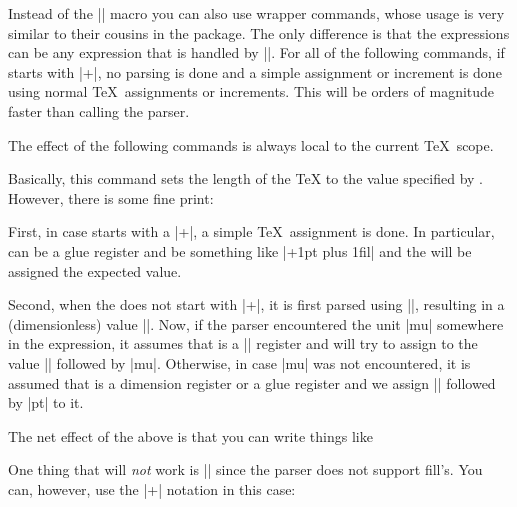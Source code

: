 Instead of the |\pgfmathparse| macro you can also use wrapper commands,
whose usage is very similar to their cousins in the \calcname{}
package. The only difference is that the expressions can be any
expression that is handled by |\pgfmathparse|.
For all of the following commands, if  starts with
|+|, no parsing is done and a simple assignment or increment is done
using normal \TeX\ assignments or increments. This will be orders of
magnitude faster than calling the parser.

The effect of the following commands is always local to the current
\TeX\ scope.

\begin{command}{\pgfmathsetlength{}}
  Basically, this command sets the length of the \TeX{}
   to the value specified by
  . However, there is some fine print:

  First, in case  starts with a |+|, a simple \TeX\
  assignment is done. In particular,  can be a glue
  register and \meta{expression} be something like |+1pt plus 1fil|
  and the \meta{register} will be assigned the expected value.

  Second, when the  does not start with |+|, it is
  first parsed using |\pgfmathparse|, resulting in a (dimensionless)
  value |\pgfmathresult|. Now, if the parser encountered the unit |mu|
  somewhere in the expression, it assumes that  is a
  |\muskip| register and will try to assign to  the
  value |\pgfmathresult| followed by |mu|. Otherwise, in case |mu| was
  not encountered, it is assumed that \meta{register} is a dimension
  register or a glue register and we assign |\pgfmathresult| followed
  by |pt| to it.

  The net effect of the above is that you can write things like
\begin{codeexample}[]
  \muskipdef{}
   \the\mymuskip 
\end{codeexample}
\begin{codeexample}[]  
  \dimendef{}  
    \the\mydimen
\end{codeexample}
\begin{codeexample}[]  
  \skipdef{}  
    \the\myskip
\end{codeexample}

  One thing that will \emph{not} work is
  || since the parser does
  not support fill's. You can, however, use the |+| notation in this
  case: 
\begin{codeexample}[]  
  \skipdef{}  
    \the\myskip
\end{codeexample}
\end{command}

